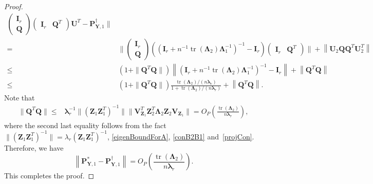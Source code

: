 \documentclass[12pt]{article} %
\DeclareMathOperator{\mytr}{tr}
\newcommand{\bQ}{\mathbf{Q}}
\newcommand{\bZ}{\mathbf{Z}}
\newcommand{\bP}{\mathbf{P}}
\newcommand{\bY}{\mathbf{Y}}
\newcommand{\bI}{\mathbf{I}}
\newcommand{\bU}{\mathbf{U}}
\newcommand{\bV}{\mathbf{V}}
\newcommand{\bfsym}[1]{\ensuremath{\boldsymbol{#1}}}
\def\blambda {\bfsym {\lambda}}
\def\bLambda {\bfsym {\Lambda}}
\theoremstyle{definition}
\begin{document}
\begin{appendices}
\begin{proof}
\begin{equation*}
\begin{split}
\begin{pmatrix}
           \bI_r \\
           \bQ
        \end{pmatrix}
        \begin{pmatrix}
            \bI_r
              &
              \bQ^T
            \end{pmatrix}
            \bU^T
            -
\bP_{\bY,1}^{\dagger}
        \Big\|
        \\
        =&
        \Big\|
        \begin{pmatrix}
           \bI_r \\
           \bQ
        \end{pmatrix}
        \left(
        \left(\bI_r+n^{-1} \mytr(\bLambda_2) \bLambda_1^{-1}\right)^{-1}
            -\bI_r
        \right)
        \begin{pmatrix}
            \bI_r
              &
              \bQ^T
            \end{pmatrix}
        \Big\|
        +\left\| \bU_2 \bQ \bQ^T \bU_2^T \right\|
        \\
        \leq &
        (1+\|\bQ^T \bQ\|)
        \left\|
        \left(\bI_r+n^{-1} \mytr(\bLambda_2) \bLambda_1^{-1}\right)^{-1}
        -\bI_r
        \right\|
        +\left\|\bQ^T \bQ\right\|
        \\
        \leq &
        (1+\|\bQ^T \bQ\|)
        \frac{
            \mytr(\bLambda_2)/(n\blambda_r)
    }{1+\mytr(\bLambda_2)/(n\blambda_r)
}
+\left\|\bQ^T \bQ\right\|.
        \end{split}
    \end{equation*}
    Note that
    \begin{equation}\label{UpperBoundQ}
        \begin{split}
        \|\bQ^T \bQ \| \leq &
        \blambda_r^{-1}\|(\bZ_1\bZ_1^T)^{-1}\| \|\bV_{\bZ_1}^T \bZ_2^T \bLambda_2 \bZ_2 \bV_{\bZ_1}\|
=O_P\left(\frac{\mytr(\bLambda_2)}{n\blambda_r}\right),
        \end{split}
    \end{equation}
    where the second last equality follows from the fact $\|(\bZ_1 \bZ_1^T)^{-1}\|=\lambda_r(\bZ_1\bZ_1^T)^{-1}$, \eqref{eigenBoundForA}, \eqref{conB2B1} and~\eqref{projCon}.
    Therefore, we have 
    \begin{equation*}
        \left\|
        \bP_{\bY,1}^* 
            -
\bP_{\bY,1}^{\dagger}
            \right\|= O_P\left(\frac{\mytr(\bLambda_2)}{n\blambda_r}\right)
            .
    \end{equation*}
    This completes the proof.


\end{proof}
\end{appendices}
\end{document}
